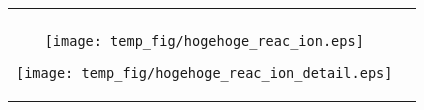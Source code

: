 \documentclass{jsarticle}
\begin{document}
\begin{figure}[htbp]
\begin{center}
\begin{tabular}{cc}
\begin{minipage}{0.5\hsize}
\begin{center}
           \end{center}
     \end{minipage}

     \\
       \begin{minipage}{0.5\hsize}
          \begin{center}
             \texttt{[image: temp\_fig/hogehoge\_reac\_ion.eps]}
          \end{center}
          \end{minipage}
       
          \begin{minipage}{0.5\hsize}
             \begin{center}
                \texttt{[image: temp\_fig/hogehoge\_reac\_ion\_detail.eps]}

             \end{center}
       \end{minipage}
    
    \end{tabular}
    \end{center}
    \label{fig:upwind}
   \end{figure}
\end{document}
